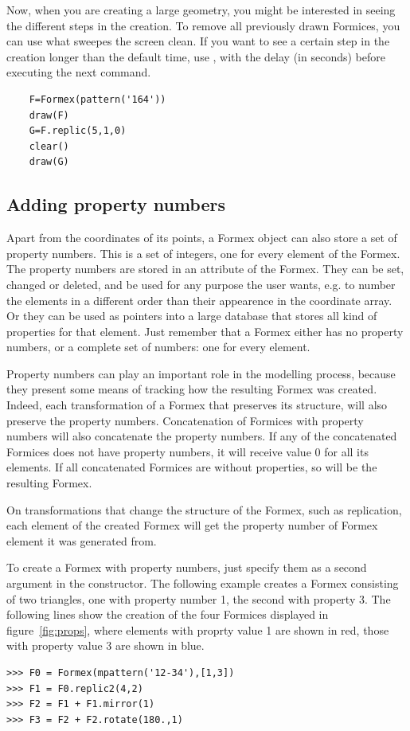 Now, when you are creating a large geometry, you might be interested in seeing the different steps in the creation. To remove all previously drawn Formices, you can use   what sweepes the screen clean. If you want to see a certain step in the creation longer than the default time, use , with  the delay (in seconds) before executing the next command.
\begin{verbatim}
	F=Formex(pattern('164'))
	draw(F)
	G=F.replic(5,1,0)
	clear()
	draw(G)
\end{verbatim}


\subsection{Adding property numbers}
\label{subsec:propnr}
Apart from the coordinates of its points, a Formex object can also store a set of property numbers. This is a set of integers, one for every element of the Formex.
The property numbers are stored in an attribute  of the Formex. They can be set, changed or deleted, and be used for any purpose the user wants, e.g. to number the elements in a different order than their appearence in the coordinate array. Or they can be used as pointers into a large database that stores all kind of properties for that element. Just remember that a Formex either has no property numbers, or a complete set of numbers: one for every element.

Property numbers can play an important role in the modelling process, because they present some means of tracking how the resulting Formex was created. Indeed, each transformation of a Formex that preserves its structure, will also preserve the property numbers. Concatenation of Formices with property numbers will also concatenate the property numbers. If any of the concatenated Formices does not have property numbers, it will receive value 0 for all its elements. If all concatenated Formices are without properties, so will be the resulting Formex.

On transformations that change the structure of the Formex, such as replication, each element of the created Formex will get the property number of Formex element it was generated from.

To create a Formex with property numbers, just specify them as a second argument in the constructor. The following example creates a Formex consisting of two triangles, one with property number 1, the second with property 3. The following lines show the creation of the four Formices displayed in figure~\ref{fig:props}, where elements with proprty value 1 are shown in red, those with property value 3 are shown in blue. 
\begin{verbatim}
>>> F0 = Formex(mpattern('12-34'),[1,3])
>>> F1 = F0.replic2(4,2)
>>> F2 = F1 + F1.mirror(1)
>>> F3 = F2 + F2.rotate(180.,1)
\end{verbatim}

